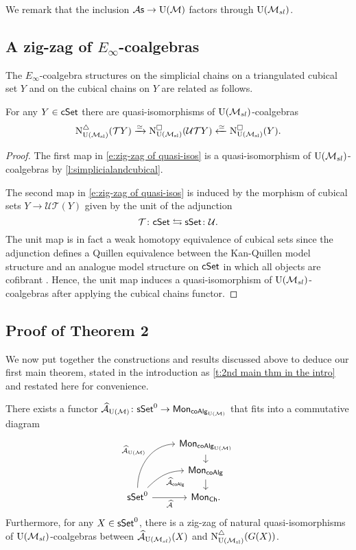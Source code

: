 We remark that the inclusion ${\mathcal{A}\mathsf{s}} \to {\operatorname{U}(\mathcal{M})}$ factors through ${\operatorname{U}(\mathcal{M}_{sl})}$.

\subsection{A zig-zag of $E_\infty$-coalgebras}
The $E_{\infty}$-coalgebra structures on the simplicial chains on a triangulated cubical set $Y$ and on the cubical chains on $Y$ are related as follows. 
\begin{proposition} \label{p:zigzag} 
For any  $Y \in \mathsf{cSet}$ there are quasi-isomorphisms of ${\operatorname{U}(\mathcal{M}_{sl})}$-coalgebras
	\begin{equation} \label{e:zig-zag of quasi-isos}
	\operatorname{N^{\triangle}_{{\operatorname{U}(\mathcal{M}_{sl})}}}(\mathcal{T}Y) \xrightarrow{\simeq}
	\operatorname{N^{\square}_{{\operatorname{U}(\mathcal{M}_{sl})}}}(\mathcal{U}\mathcal{T}Y) \xleftarrow{\simeq}
	\operatorname{N^{\square}_{{\operatorname{U}(\mathcal{M}_{sl})}}}(Y).
	\end{equation}	
	\end{proposition}
	\begin{proof}
	The first map in \eqref{e:zig-zag of quasi-isos} is a quasi-isomorphism of ${\operatorname{U}(\mathcal{M}_{sl})}$-coalgebras by \cref{l:simplicialandcubical}.
	
	The second map in \eqref{e:zig-zag of quasi-isos} is induced by the morphism of cubical sets $Y \to \mathcal{U} \mathcal{T} (Y)$ given by the unit of the adjunction
	$$\mathcal{T} \colon \mathsf{cSet} \leftrightarrows \mathsf{sSet} \colon \mathcal{U}.$$
	The unit map is in fact a weak homotopy equivalence of cubical sets since the adjunction defines a Quillen equivalence between the Kan-Quillen model structure and an analogue model structure on $\mathsf{cSet}$ in which all objects are cofibrant \cite{cisinski2006presheaves}.
	Hence, the unit map induces a quasi-isomorphism of ${\operatorname{U}(\mathcal{M}_{sl})}$-coalgebras after applying the cubical chains functor. 
	\end{proof}

\subsection{Proof of Theorem 2}

We now put together the constructions and results discussed above to deduce our first main theorem, stated in the introduction as \cref{t:2nd main thm in the intro} and restated here for convenience.

\begin{nntheorem}
	There exists a functor $\operatorname{\mathcal{\widehat{A}}}_{\operatorname{U}(\mathcal{M})} \colon \mathsf{sSet}^0 \to \mathsf{Mon}_{\mathsf{coAlg}_{\operatorname{U}(\mathcal{M})}}$ that fits into a commutative diagram
	\begin{equation*}
	\begin{tikzcd}[row sep=small]
	& \Mon_{\coAlg_\UM} \arrow[d] \\
	& \Mon_{\coAlg} \arrow[d] \\
	\sSet^0
	\arrow[r, "\Ahat"', ]
	\arrow[ru, "\Ahat_{\coAlg}"', out=45, in=180] 
	\arrow[ruu, "\Ahat_\UM", out=90, in=180]
	& \Mon_{\Ch}.
	\end{tikzcd}
	\end{equation*}
	Furthermore, for any $X \in \mathsf{sSet}^0$, there is a zig-zag of natural quasi-isomorphisms of ${\operatorname{U}(\mathcal{M}_{sl})}$-coalgebras between $\operatorname{\mathcal{\widehat{A}}}_{\operatorname{U}(\mathcal{M}_{sl})}(X)$ and $\operatorname{N^{\triangle}_{{\operatorname{U}(\mathcal{M}_{sl})}}}(G(X))$.
\end{nntheorem}

